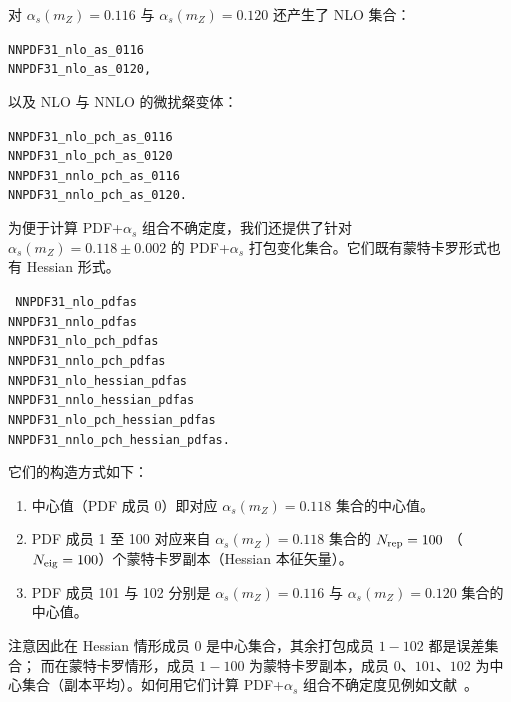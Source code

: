 \begin{itemize}
对 $\alpha_s(m_Z)=0.116$ 与 $\alpha_s(m_Z)=0.120$ 还产生了 NLO 集合：
\begin{flushleft}
  \tt NNPDF31\_nlo\_as\_0116 \\
  \tt NNPDF31\_nlo\_as\_0120, \\
\end{flushleft}
以及 NLO 与 NNLO 的微扰粲变体：
\begin{flushleft}
  \tt NNPDF31\_nlo\_pch\_as\_0116 \\
  \tt NNPDF31\_nlo\_pch\_as\_0120 \\
\tt NNPDF31\_nnlo\_pch\_as\_0116\\
\tt NNPDF31\_nnlo\_pch\_as\_0120.\\
\end{flushleft}


为便于计算 PDF+$\alpha_s$ 组合不确定度，我们还提供了针对 $\alpha_s(m_Z)=0.118\pm0.002$ 的
PDF+$\alpha_s$ 打包变化集合。它们既有蒙特卡罗形式也有 Hessian 形式。
\begin{flushleft}
  \tt
NNPDF31\_nlo\_pdfas	\\
NNPDF31\_nnlo\_pdfas	\\
NNPDF31\_nlo\_pch\_pdfas \\	
NNPDF31\_nnlo\_pch\_pdfas  \\	
NNPDF31\_nlo\_hessian\_pdfas \\
NNPDF31\_nnlo\_hessian\_pdfas \\	
NNPDF31\_nlo\_pch\_hessian\_pdfas \\	
NNPDF31\_nnlo\_pch\_hessian\_pdfas. \\
\end{flushleft}
它们的构造方式如下：
\begin{enumerate}
\item 中心值（PDF 成员 0）即对应 $\alpha_s(m_Z)=0.118$ 集合的中心值。
\item PDF 成员 1 至 100 对应来自 $\alpha_s(m_Z)=0.118$ 集合的 $N_{\mathrm{rep}}=100$
  （$N_{\rm eig}=100$）个蒙特卡罗副本（Hessian 本征矢量）。
\item PDF 成员 101 与 102 分别是 $\alpha_s(m_Z)=0.116$ 与 $\alpha_s(m_Z)=0.120$ 集合的中心值。
\end{enumerate}
注意因此在 Hessian 情形成员 0 是中心集合，其余打包成员 $1-102$ 都是误差集合；
而在蒙特卡罗情形，成员 $1-100$ 为蒙特卡罗副本，成员 0、$101$、$102$
为中心集合（副本平均）。如何用它们计算 PDF+$\alpha_s$ 组合不确定度见例如文献~\cite{Butterworth:2015oua}。



\end{itemize}
